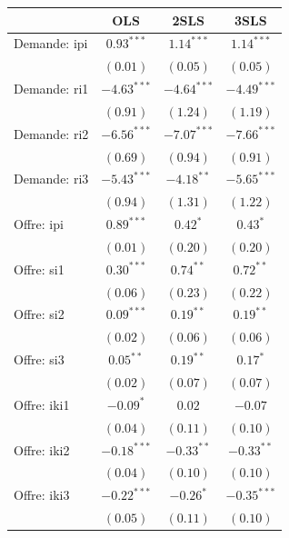 \documentclass[11pt,]{article}
\begin{document}
\begin{table}[!htbp]
\begin{center}
\begin{tabular}{l c c c }
\hline
 & OLS & 2SLS & 3SLS \\
\hline
Demande: ipi        & $0.93^{***}$  & $1.14^{***}$  & $1.14^{***}$  \\
                    & $(0.01)$      & $(0.05)$      & $(0.05)$      \\
Demande: ri1        & $-4.63^{***}$ & $-4.64^{***}$ & $-4.49^{***}$ \\
                    & $(0.91)$      & $(1.24)$      & $(1.19)$      \\
Demande: ri2        & $-6.56^{***}$ & $-7.07^{***}$ & $-7.66^{***}$ \\
                    & $(0.69)$      & $(0.94)$      & $(0.91)$      \\
Demande: ri3        & $-5.43^{***}$ & $-4.18^{**}$  & $-5.65^{***}$ \\
                    & $(0.94)$      & $(1.31)$      & $(1.22)$      \\
Offre: ipi          & $0.89^{***}$  & $0.42^{*}$    & $0.43^{*}$    \\
                    & $(0.01)$      & $(0.20)$      & $(0.20)$      \\
Offre: si1          & $0.30^{***}$  & $0.74^{**}$   & $0.72^{**}$   \\
                    & $(0.06)$      & $(0.23)$      & $(0.22)$      \\
Offre: si2          & $0.09^{***}$  & $0.19^{**}$   & $0.19^{**}$   \\
                    & $(0.02)$      & $(0.06)$      & $(0.06)$      \\
Offre: si3          & $0.05^{**}$   & $0.19^{**}$   & $0.17^{*}$    \\
                    & $(0.02)$      & $(0.07)$      & $(0.07)$      \\
Offre: iki1         & $-0.09^{*}$   & $0.02$        & $-0.07$       \\
                    & $(0.04)$      & $(0.11)$      & $(0.10)$      \\
Offre: iki2         & $-0.18^{***}$ & $-0.33^{**}$  & $-0.33^{**}$  \\
                    & $(0.04)$      & $(0.10)$      & $(0.10)$      \\
Offre: iki3         & $-0.22^{***}$ & $-0.26^{*}$   & $-0.35^{***}$ \\
                    & $(0.05)$      & $(0.11)$      & $(0.10)$      \\

\end{tabular}
\end{center}
\end{table}
\end{document}

